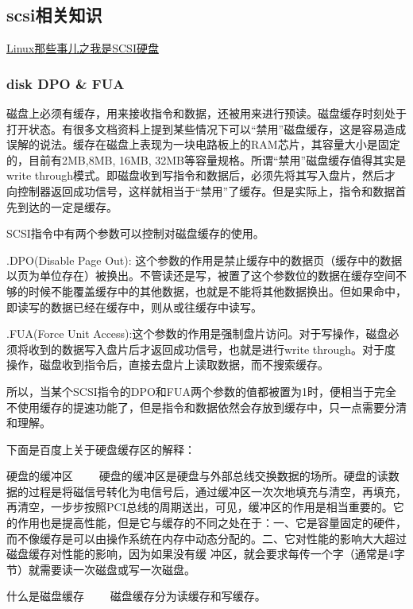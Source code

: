 \documentclass[11pt]{article}
\begin{document}
\subsection{scsi相关知识}
\label{sec-1.5}


   \href{http://blog.csdn.net/fudan_abc/archive/2007/12/10/1927945.aspx}{Linux那些事儿之我是SCSI硬盘}

\subsubsection{disk DPO \& FUA}
\label{sec-1.5.1}

磁盘上必须有缓存，用来接收指令和数据，还被用来进行预读。磁盘缓存时刻处于打开状态。有很多文档资料上提到某些情况下可以“禁用”磁盘缓存，这是容易造成误解的说法。缓存在磁盘上表现为一块电路板上的RAM芯片，其容量大小是固定的，目前有2MB,8MB, 16MB, 32MB等容量规格。所谓“禁用”磁盘缓存值得其实是write through模式。即磁盘收到写指令和数据后，必须先将其写入盘片，然后才向控制器返回成功信号，这样就相当于“禁用”了缓存。但是实际上，指令和数据首先到达的一定是缓存。

     SCSI指令中有两个参数可以控制对磁盘缓存的使用。

     .DPO(Disable Page Out): 这个参数的作用是禁止缓存中的数据页（缓存中的数据以页为单位存在）被换出。不管读还是写，被置了这个参数位的数据在缓存空间不够的时候不能覆盖缓存中的其他数据，也就是不能将其他数据换出。但如果命中，即读写的数据已经在缓存中，则从或往缓存中读写。

     .FUA(Force Unit  Access):这个参数的作用是强制盘片访问。对于写操作，磁盘必须将收到的数据写入盘片后才返回成功信号，也就是进行write through。对于度操作，磁盘收到指令后，直接去盘片上读取数据，而不搜索缓存。

     所以，当某个SCSI指令的DPO和FUA两个参数的值都被置为1时，便相当于完全不使用缓存的提速功能了，但是指令和数据依然会存放到缓存中，只一点需要分清和理解。

下面是百度上关于硬盘缓存区的解释：

硬盘的缓冲区
　　硬盘的缓冲区是硬盘与外部总线交换数据的场所。硬盘的读数据的过程是将磁信号转化为电信号后，通过缓冲区一次次地填充与清空，再填充，再清空，一步步按照PCI总线的周期送出，可见，缓冲区的作用是相当重要的。它的作用也是提高性能，但是它与缓存的不同之处在于：一、它是容量固定的硬件，而不像缓存是可以由操作系统在内存中动态分配的。二、它对性能的影响大大超过磁盘缓存对性能的影响，因为如果没有缓 冲区，就会要求每传一个字（通常是4字节）就需要读一次磁盘或写一次磁盘。

什么是磁盘缓存
　　磁盘缓存分为读缓存和写缓存。
\end{document}
